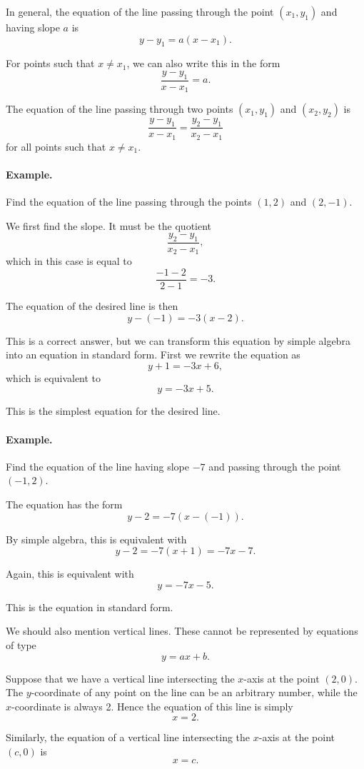 \documentclass[12pt]{book} %
\begin{document}
In general, the equation of the line passing through the point $(x_1,y_1)$ and having slope $a$ is
\[
y-y_1=a(x-x_1).
\]

For points such that $x\ne x_1$, we can also write this in the form
\[
\frac{y-y_1}{x-x_1}=a.
\]

The equation of the line passing through two points $(x_1,y_1)$ and $(x_2,y_2)$ is
\[
\frac{y-y_1}{x-x_1}=\frac{y_2-y_1}{x_2-x_1}
\]
for all points such that $x\ne x_1$.

\paragraph{Example.}
Find the equation of the line passing through the points $(1,2)$ and $(2,-1)$.

We first find the slope. It must be the quotient
\[
\frac{y_2-y_1}{x_2-x_1},
\]
which in this case is equal to
\[
\frac{-1-2}{2-1}=-3.
\]

The equation of the desired line is then
\[
y-(-1)=-3(x-2).
\]

This is a correct answer, but we can transform this equation by simple algebra into an equation in standard form. First we rewrite the equation as
\[
y+1=-3x+6,
\]
which is equivalent to
\[
y=-3x+5.
\]

This is the simplest equation for the desired line.

\paragraph{Example.}
Find the equation of the line having slope $-7$ and passing through the point $(-1,2)$.

The equation has the form
\[
y-2=-7(x-(-1)).
\]

By simple algebra, this is equivalent with
\[
y-2=-7(x+1)=-7x-7.
\]

Again, this is equivalent with
\[
y=-7x-5.
\]

This is the equation in standard form.

We should also mention vertical lines. These cannot be represented by equations of type
\[
y=ax+b.
\]

Suppose that we have a vertical line intersecting the $x$-axis at the point $(2,0)$. The $y$-coordinate of any point on the line can be an arbitrary number, while the $x$-coordinate is always 2. Hence the equation of this line is simply
\[
x=2.
\]

Similarly, the equation of a vertical line intersecting the $x$-axis at the point $(c,0)$ is
\[
x=c.
\]
\end{document}
